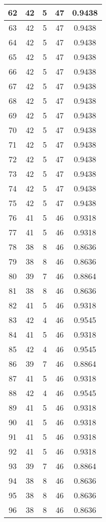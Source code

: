 \documentclass[letterpaper, 12pt]{article}
\begin{document}
\begin{longtable}{|c|c|c|c|c|}
\hline
62 & 42 & 5 & 47 & 0.9438 \\
\hline
63 & 42 & 5 & 47 & 0.9438 \\
\hline
64 & 42 & 5 & 47 & 0.9438 \\
\hline
65 & 42 & 5 & 47 & 0.9438 \\
\hline
66 & 42 & 5 & 47 & 0.9438 \\
\hline
67 & 42 & 5 & 47 & 0.9438 \\
\hline
68 & 42 & 5 & 47 & 0.9438 \\
\hline
69 & 42 & 5 & 47 & 0.9438 \\
\hline
70 & 42 & 5 & 47 & 0.9438 \\
\hline
71 & 42 & 5 & 47 & 0.9438 \\
\hline
72 & 42 & 5 & 47 & 0.9438 \\
\hline
73 & 42 & 5 & 47 & 0.9438 \\
\hline
74 & 42 & 5 & 47 & 0.9438 \\
\hline
75 & 42 & 5 & 47 & 0.9438 \\
\hline
76 & 41 & 5 & 46 & 0.9318 \\
\hline
77 & 41 & 5 & 46 & 0.9318 \\
\hline
78 & 38 & 8 & 46 & 0.8636 \\
\hline
79 & 38 & 8 & 46 & 0.8636 \\
\hline
80 & 39 & 7 & 46 & 0.8864 \\
\hline
81 & 38 & 8 & 46 & 0.8636 \\
\hline
82 & 41 & 5 & 46 & 0.9318 \\
\hline
83 & 42 & 4 & 46 & 0.9545 \\
\hline
84 & 41 & 5 & 46 & 0.9318 \\
\hline
85 & 42 & 4 & 46 & 0.9545 \\
\hline
86 & 39 & 7 & 46 & 0.8864 \\
\hline
87 & 41 & 5 & 46 & 0.9318 \\
\hline
88 & 42 & 4 & 46 & 0.9545 \\
\hline
89 & 41 & 5 & 46 & 0.9318 \\
\hline
90 & 41 & 5 & 46 & 0.9318 \\
\hline
91 & 41 & 5 & 46 & 0.9318 \\
\hline
92 & 41 & 5 & 46 & 0.9318 \\
\hline
93 & 39 & 7 & 46 & 0.8864 \\
\hline
94 & 38 & 8 & 46 & 0.8636 \\
\hline
95 & 38 & 8 & 46 & 0.8636 \\
\hline
96 & 38 & 8 & 46 & 0.8636 \\

\end{longtable}
\end{document}
